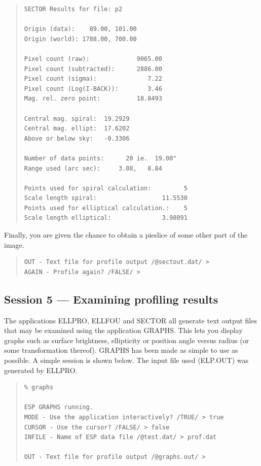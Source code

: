 \documentclass[twoside,11pt]{article}
\newcommand{\xlabel}[1]{}
\newenvironment{myquote}{\begin{quote}\begin{small}}{\end{small}\end{quote}}
\begin{document}
\begin{myquote}
\begin{verbatim}
SECTOR Results for file: p2
 
Origin (data):    89.00, 101.00
Origin (world): 1788.00, 700.00
 
Pixel count (raw):             9065.00
Pixel count (subtracted):      2886.00
Pixel count (sigma):              7.22
Pixel count (Log(I-BACK)):        3.46
Mag. rel. zero point:          18.8493
 
Central mag. spiral:  19.2929
Central mag. ellipt:  17.6202
Above or below sky:   -0.3306
 
Number of data points:      20 ie.  19.00"
Range used (arc sec):     3.08,   8.84
 
Points used for spiral calculation:         5
Scale length spiral:                  11.5530
Points used for elliptical calculation.:    5
Scale length elliptical:              3.98091
\end{verbatim}
\end{myquote}

Finally, you are given the chance to obtain a pieslice of some other
part of the image.

\begin{myquote}
\begin{verbatim}
OUT - Text file for profile output /@sectout.dat/ >  
AGAIN - Profile again? /FALSE/ > 
\end{verbatim}
\end{myquote}


\subsection{Session 5 --- Examining profiling results}
\xlabel{SESSION5}

The applications ELLPRO, ELLFOU and SECTOR all generate text output
files that may be examined using the application GRAPHS. This lets
you display graphs such as surface brightness, ellipticity or position
angle versus radius (or some transformation thereof). GRAPHS
has been made as simple to use as possible. A simple session is shown below.
The input file used (ELP.OUT) was generated by ELLPRO.

\begin{myquote}
\begin{verbatim}
% graphs
 
ESP GRAPHS running.
MODE - Use the application interactively? /TRUE/ > true
CURSOR - Use the cursor? /FALSE/ > false
INFILE - Name of ESP data file /@test.dat/ > prof.dat
 
OUT - Text file for profile output /@graphs.out/ > 
\end{verbatim}
\end{myquote}
\end{document}
